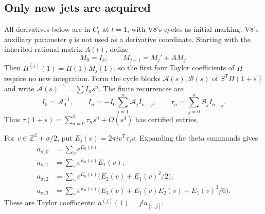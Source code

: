 \documentclass[11pt]{article}
\theoremstyle{definition}
\theoremstyle{remark}
\newcommand{\Z}{\mathbb Z}
\begin{document}
\subsection{Only new jets are acquired}
All derivatives below are in $C_t$ at $t=1$, with V8's cycles as initial
marking. V8's auxiliary parameter $q$ is not used as a derivative coordinate.
Starting with the inherited rational matrix $A(t)$, define
\begin{equation}
 M_0=I_4,\qquad M_{j+1}=M_j'+AM_j.
 \label{eq:v9-Mrec}
\end{equation}
Then $\Pi^{(j)}(1)=\Pi(1)M_j(1)$, so the first four Taylor coefficients
of $\Pi$ require no new integration. Form the cycle blocks
$\mathcal A(s),\mathcal B(s)$ of $S^{\mathsf T}\Pi(1+s)$ and write
$\mathcal A(s)^{-1}=\sum I_ns^n$. The finite recurrences are
\begin{equation}
 I_0=\mathcal A_0^{-1},\qquad
 I_n=-I_0\sum_{j=1}^n\mathcal A_j I_{n-j},\qquad
 \tau_n=\sum_{j=0}^n\mathcal B_jI_{n-j}.
 \label{eq:v9-taujets}
\end{equation}
Thus $\tau(1+s)=\sum_{n=0}^3\tau_ns^n+O(s^4)$ has certified entries.

For $v\in\Z^2+\sigma/2$, put $E_j(v)=2\pi i v^{\mathsf T}\tau_jv$.
Expanding the theta summands gives
\begin{equation}
 \begin{aligned}
 a_{\sigma,0}&=\sum_v e^{E_0(v)},\\
 a_{\sigma,1}&=\sum_v e^{E_0(v)}E_1(v),\\
 a_{\sigma,2}&=\sum_v e^{E_0(v)}\bigl(E_2(v)+E_1(v)^2/2\bigr),\\
 a_{\sigma,3}&=\sum_v e^{E_0(v)}
       \bigl(E_3(v)+E_1(v)E_2(v)+E_1(v)^3/6\bigr).
 \end{aligned}
 \label{eq:v9-theta-jets}
\end{equation}
These are Taylor coefficients: $a^{(j)}(1)=j!a_{[:,j]}$.
\end{document}
